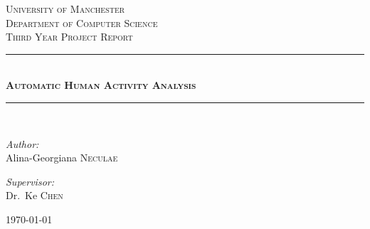 \documentclass[11pt]{report}
\newcommand{\HRule}{\rule{\linewidth}{0.7mm}}
\begin{document}
\begin{titlepage}
\begin{center}


\textsc{\LARGE University of Manchester} \\ [1.5cm]
\textsc{\Large Department of Computer Science} \\ [0.5cm]
\textsc{\Large Third Year Project Report}\\[0.5cm]

\HRule \\[0.4cm]
\textsc{\huge \bfseries Automatic Human Activity Analysis} \\ [0.4cm]
\HRule \\[1.5cm]

\begin{minipage}{0.4\textwidth}
\begin{flushleft} \large
\emph{Author:}\\
Alina-Georgiana \textsc{Neculae}
\end{flushleft}
\end{minipage}
\begin{minipage}{0.4\textwidth}
\begin{flushright} \large
\emph{Supervisor:} \\
Dr.~Ke \textsc{Chen}
\end{flushright}
\end{minipage}

\vfill

{\large \today}

\end{center}
\end{titlepage}
\end{document}
